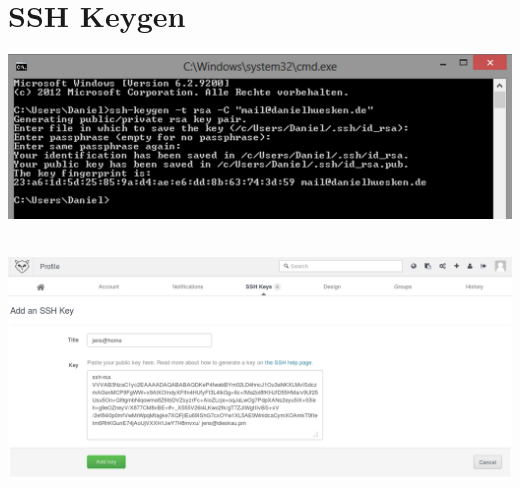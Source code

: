 \documentclass[c]{beamer}
\begin{document}
\section{SSH Keygen}
\begin{frame}
  \begin{center}
  \end{center}
\end{frame}

\begin{frame}
 \begin{center}
    \includegraphics[scale=0.22]{images/ssh.png}
 \end{center}
\end{frame}

\begin{frame}
 \begin{center}
     \\
    \vspace{20pt}
    \includegraphics[scale=0.21]{images/github-sshkey.png}
 \end{center}
\end{frame}

%
\end{document}
